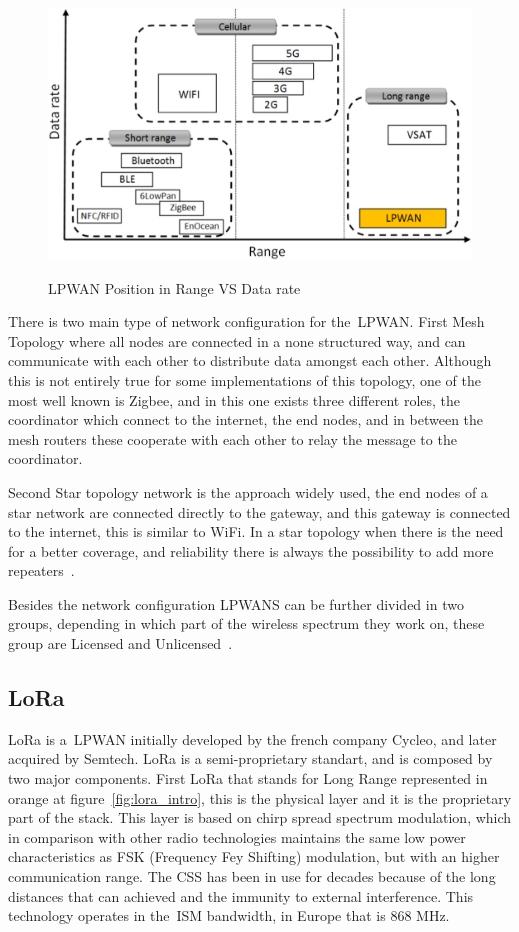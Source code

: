 \begin{figure}[htbp]
  \centering
  
    {\includegraphics[width=0.5\linewidth]{Chapters/Figures/LPWAN-Positioning.JPG}}%
 
  \caption{LPWAN Position in Range VS Data rate~\cite{Mekki2019}}
  \label{fig:LPWAN_Positioning}
\end{figure}

There is two main type of network configuration for the~\gls{LPWAN}.
First Mesh Topology where all nodes are connected in a none structured way, and can communicate with each other to distribute data amongst each other. Although this is not entirely true for some implementations of this topology, one of the most well known is Zigbee, and in this one exists three different roles, the coordinator which connect to the internet, the end nodes, and in between the mesh routers these cooperate with each other to relay the message to the coordinator. 

Second Star topology network is the approach widely used, the end nodes of a star network are connected directly to the gateway, and this gateway is connected to the internet, this is similar to WiFi. In a star topology when there is the  need for a better coverage,  and reliability there is always the possibility to add more repeaters~\cite{LPLinkLabs}.

Besides the network configuration LPWANS can be further divided in two groups, depending in which part of the wireless spectrum they work on, these group are Licensed and Unlicensed~\cite{LPZourmand2019}.


\subsection{LoRa} %
\label{sec:lora_sota}


LoRa is a~\gls{LPWAN} initially developed by the french company Cycleo, and later acquired by Semtech. LoRa is a semi-proprietary standart, and is composed by two major components. First LoRa that stands for Long Range represented in orange at figure~\ref{fig:lora_intro}, this is the physical layer and it is the proprietary part of the stack. This layer  is based on chirp spread spectrum modulation, which in comparison with other radio technologies maintains the same low power characteristics as FSK (Frequency Fey Shifting) modulation, but with an higher communication range. The CSS has been in use for decades because of the long distances that can achieved and the immunity to external interference. This technology operates in the~\gls{ISM} bandwidth, in Europe that is 868 MHz. 

